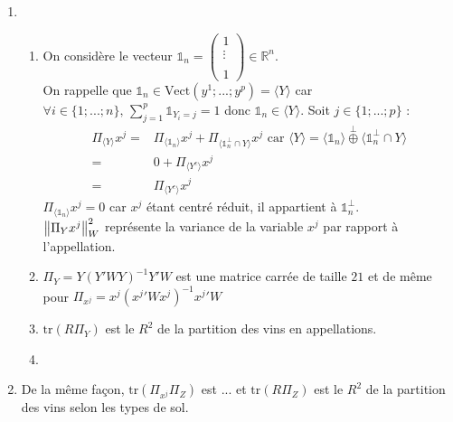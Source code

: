 \documentclass{article}
\begin{document}
\begin{enumerate}
\item 
	\begin{enumerate}
	\item On considère le vecteur $\mathds{1}_n=\begin{pmatrix}
	1 \\ 
	\vdots \\ 
	 \\ 
	1
	\end{pmatrix} \in\mathbb{R}^{n}$.\\
	 On rappelle que $\mathds{1}_n\in \text{Vect}\left(y^1;...;y^p\right)=\langle Y \rangle$ car $\forall i\in\{1;...;n\},\, \sum_{j=1}^p \mathds{1}_{Y_i=j}=1$ donc $\mathds{1}_n\in \langle Y \rangle$.
Soit $j\in\{1;...;p\}$ :
	\begin{align*}
	\Pi_{\langle Y \rangle} x^j =& \Pi_{\langle\mathds{1}_n\rangle}x^j +\Pi_{\langle \mathds{1}_n^{\perp} \cap Y \rangle} x^j  \text{ car } \langle Y \rangle = \langle \mathds{1}_n \rangle \overset{\perp}{\oplus}\langle \mathds{1}_n^{\perp} \cap Y \rangle \\
	  =& 0 + \Pi_{\langle Y^c \rangle} x^j \\
	  =& \Pi_{\langle Y^c \rangle} x^j
	\end{align*}
 $\Pi_{\langle\mathds{1}_n\rangle}x^j=0$ car $x^j$ étant centré réduit, il appartient à $\mathds{1}_n^{\perp}$.\\
 
	
	$\left\| \Pi_Yx^j\right\|^2_{W}$ représente la variance de la variable $x^j$ par rapport à l'appellation.
	\item $\Pi_Y=Y\left(Y'WY\right)^{-1}Y'W$ est une matrice carrée de taille $21$ et de même pour $\Pi_{x^j}=x^{j}\left({x^{j}}'Wx^{j}\right)^{-1}{x^{j}}'W$
	
	\item $\text{tr}(R \Pi_Y)$ est le $R^2$ de la partition des vins en appellations.
	
	\item 
	\end{enumerate}

\item De la même façon, $\text{tr}(\Pi_{x^j}\Pi_{Z})$ est ... et $\text{tr}(R\Pi_{Z})$ est le $R^2$ de la partition des vins selon les types de sol.
\end{enumerate}
\end{document}
